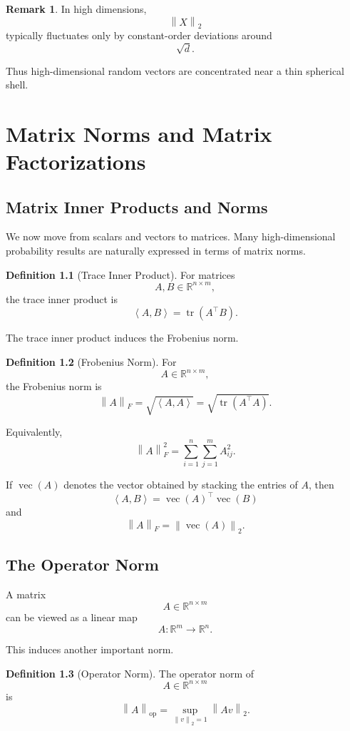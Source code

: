 \documentclass[12pt,oneside]{book}
\numberwithin{equation}{section}
\theoremstyle{definition}
\newtheorem{definition}{Definition}[section]
\newtheorem{remark}{Remark}[section]
\theoremstyle{plain}
\theoremstyle{remark}
\newcommand{\R}{\mathbb{R}}
\newcommand{\norm}[1]{\left\lVert #1 \right\rVert}
\newcommand{\inner}[2]{\left\langle #1, #2 \right\rangle}
\newcommand{\tr}{\operatorname{tr}}
\begin{document}
\begin{remark}
In high dimensions,
\[
\norm{X}_2
\]
typically fluctuates only by constant-order deviations around
\[
\sqrt{d}.
\]

Thus high-dimensional random vectors are concentrated near a thin spherical shell.
\end{remark}

\chapter{Matrix Norms and Matrix Factorizations}

\section{Matrix Inner Products and Norms}

We now move from scalars and vectors to matrices. Many high-dimensional probability results are naturally expressed in terms of matrix norms.

\begin{definition}[Trace Inner Product]
For matrices
\[
A,B\in\R^{n\times m},
\]
the trace inner product is
\[
\inner{A}{B}
=
\tr(A^\top B).
\]
\end{definition}

The trace inner product induces the Frobenius norm.

\begin{definition}[Frobenius Norm]
For
\[
A\in\R^{n\times m},
\]
the Frobenius norm is
\[
\norm{A}_F
=
\sqrt{\inner{A}{A}}
=
\sqrt{\tr(A^\top A)}.
\]
\end{definition}

Equivalently,
\[
\norm{A}_F^2
=
\sum_{i=1}^n\sum_{j=1}^m A_{ij}^2.
\]

If $\operatorname{vec}(A)$ denotes the vector obtained by stacking the entries of $A$, then
\[
\inner{A}{B}
=
\operatorname{vec}(A)^\top \operatorname{vec}(B)
\]
and
\[
\norm{A}_F
=
\norm{\operatorname{vec}(A)}_2.
\]

\section{The Operator Norm}

A matrix
\[
A\in\R^{n\times m}
\]
can be viewed as a linear map
\[
A:\R^m\to\R^n.
\]

This induces another important norm.

\begin{definition}[Operator Norm]
The operator norm of
\[
A\in\R^{n\times m}
\]
is
\[
\norm{A}_{\mathrm{op}}
=
\sup_{\norm{v}_2=1}
\norm{Av}_2.
\]
\end{definition}
\end{document}
